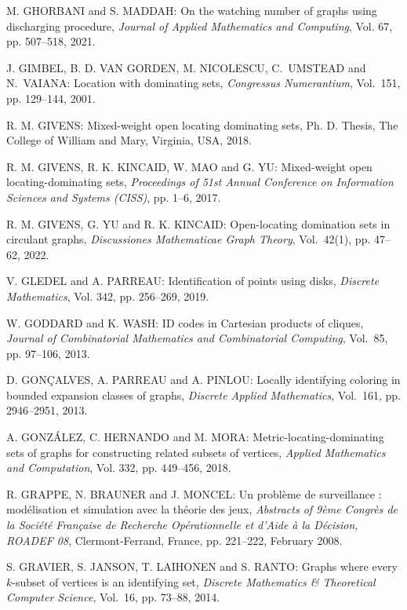\begin{thebibliography}{999}
M. GHORBANI and S. MADDAH: On the watching number of graphs using discharging procedure, {\it Journal of Applied Mathematics and Computing}, Vol. 67, pp. 507--518, 2021.

J. GIMBEL, B. D. VAN GORDEN, M. NICOLESCU, C.~UMSTEAD and N.~VAIANA: Location with dominating sets, {\it Congressus Numerantium}, Vol.~151, pp. 129--144, 2001.

R. M. GIVENS: Mixed-weight open locating dominating sets, Ph. D. Thesis, The College of William and Mary, Virginia, USA, 2018.

R. M. GIVENS, R. K. KINCAID, W. MAO and G. YU: Mixed-weight open locating-dominating sets, {\it Proceedings of 51st Annual Conference on Information Sciences and Systems (CISS)}, pp. 1--6, 2017.

R. M. GIVENS, G. YU and R. K. KINCAID: Open-locating domination sets in
circulant graphs, {\it Discussiones Mathematicae Graph Theory}, Vol.~42(1), pp. 47--62, 2022.

V. GLEDEL and A. PARREAU: Identification of points using disks, {\it Discrete Mathematics}, Vol. 342, pp. 256--269, 2019.

W. GODDARD and K. WASH: ID codes in Cartesian products of cliques, {\it Journal of Combinatorial Mathematics and Combinatorial Computing}, Vol.~85, pp. 97--106, 2013.

D. GON\c CALVES, A. PARREAU and A. PINLOU: Locally identifying coloring in bounded expansion classes of graphs, {\it Discrete Applied Mathematics}, Vol.~161, pp. 2946--2951, 2013.

A. GONZ\'ALEZ, C. HERNANDO and  M. MORA: Metric-locating-dominating sets of graphs for constructing related subsets of vertices, {\it Applied Mathematics and Computation}, Vol. 332, pp. 449--456, 2018.

R. GRAPPE, N. BRAUNER and J. MONCEL: Un probl\`eme de surveillance : mod\'elisation et simulation avec la th\'eorie des jeux, {\it Abstracts of 9\`eme Congr\`es de la Soci\'et\'e Fran\c{c}aise de Recherche Op\'erationnelle et d'Aide \`a la D\'ecision, ROADEF 08}, Clermont-Ferrand, France, pp. 221--222, February 2008.

S. GRAVIER, S. JANSON, T. LAIHONEN and S. RANTO: Graphs where every $k$-subset of vertices is an identifying set, {\it Discrete Mathematics \& Theoretical Computer Science}, Vol.~16, pp. 73--88, 2014.


\end{thebibliography}
